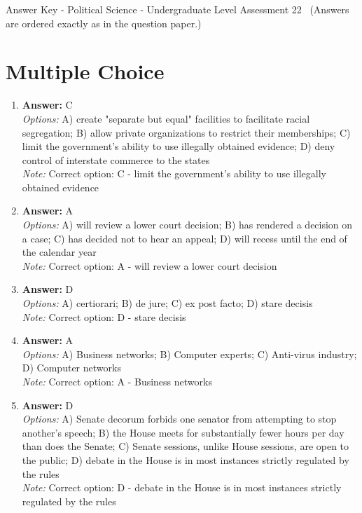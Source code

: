 \documentclass[12pt]{article}
\begin{document}
\begin{center}
Answer Key - Political Science - Undergraduate Level Assessment 22 \
\small (Answers are ordered exactly as in the question paper.)
\end{center}

\section*{Multiple Choice}
\begin{enumerate}[label=\arabic*.]
\item \textbf{Answer:} C
\\ \textit{Options:} A) create "separate but equal" facilities to facilitate racial segregation; B) allow private organizations to restrict their memberships; C) limit the government's ability to use illegally obtained evidence; D) deny control of interstate commerce to the states
\\ \textit{Note:} Correct option: C - limit the government's ability to use illegally obtained evidence
\item \textbf{Answer:} A
\\ \textit{Options:} A) will review a lower court decision; B) has rendered a decision on a case; C) has decided not to hear an appeal; D) will recess until the end of the calendar year
\\ \textit{Note:} Correct option: A - will review a lower court decision
\item \textbf{Answer:} D
\\ \textit{Options:} A) certiorari; B) de jure; C) ex post facto; D) stare decisis
\\ \textit{Note:} Correct option: D - stare decisis
\item \textbf{Answer:} A
\\ \textit{Options:} A) Business networks; B) Computer experts; C) Anti-virus industry; D) Computer networks
\\ \textit{Note:} Correct option: A - Business networks
\item \textbf{Answer:} D
\\ \textit{Options:} A) Senate decorum forbids one senator from attempting to stop another's speech; B) the House meets for substantially fewer hours per day than does the Senate; C) Senate sessions, unlike House sessions, are open to the public; D) debate in the House is in most instances strictly regulated by the rules
\\ \textit{Note:} Correct option: D - debate in the House is in most instances strictly regulated by the rules
\end{enumerate}
\end{document}
